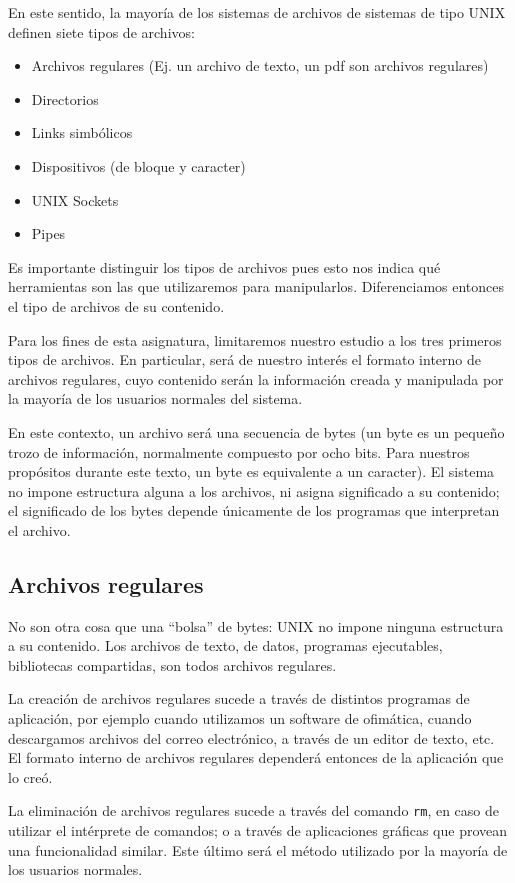 \documentclass[12pt]{article}
\begin{document}
En este sentido, la mayoría de los sistemas de archivos de sistemas de 
tipo UNIX definen siete tipos de archivos:

\begin{itemize}
\item Archivos regulares (Ej. un archivo de texto, un pdf son archivos regulares)
\item Directorios
\item Links simbólicos
\item Dispositivos (de bloque y caracter) 
\item UNIX Sockets  
\item Pipes 
\end{itemize}

Es importante distinguir los tipos de archivos pues esto nos indica qué 
herramientas son las que utilizaremos para manipularlos. Diferenciamos 
entonces el tipo de archivos de su contenido.   

Para los fines de esta asignatura, limitaremos nuestro estudio a los tres 
primeros tipos de archivos. En particular, será de nuestro interés el 
formato interno de archivos regulares, cuyo contenido serán la información 
creada y manipulada por la mayoría de los usuarios normales del sistema.  

En este contexto, un archivo será una secuencia de bytes (un byte es un 
pequeño trozo de información, normalmente compuesto por ocho bits. Para 
nuestros propósitos durante este texto, un byte es equivalente a un 
caracter). El sistema no impone estructura alguna a los archivos, ni 
asigna significado a su contenido; el significado de los bytes depende 
únicamente de los programas que interpretan el archivo. 

\subsection*{Archivos regulares}
No son otra cosa que una ``bolsa'' de bytes: UNIX no impone ninguna estructura 
a su contenido. Los archivos de texto, de datos, programas ejecutables, 
bibliotecas compartidas, son todos archivos regulares.

La creación de archivos regulares sucede a través de distintos programas de 
aplicación, por ejemplo cuando utilizamos un software de ofimática, cuando 
descargamos archivos del correo electrónico, a través de un editor de texto, 
etc. El formato interno de archivos regulares dependerá entonces de la 
aplicación que lo creó. 

La eliminación de archivos regulares sucede a través del comando \texttt{rm}, en
caso de utilizar el intérprete de comandos; o a través de aplicaciones 
gráficas que provean una funcionalidad similar. Este último será el método 
utilizado por la mayoría de los usuarios normales. 
\end{document}

